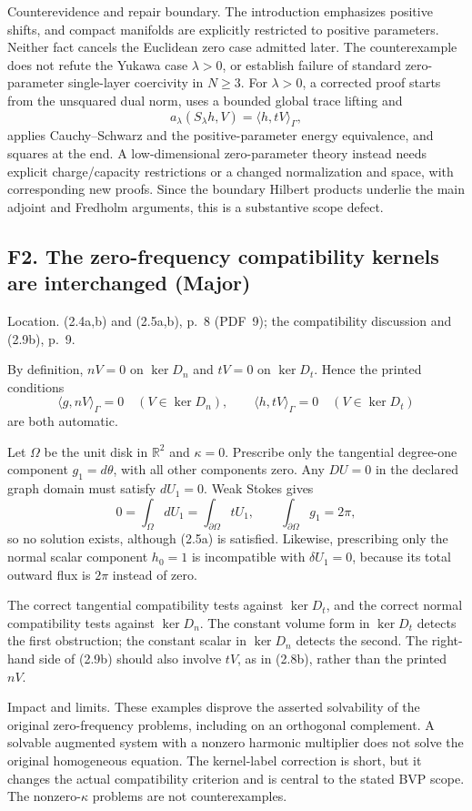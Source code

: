 \documentclass[10pt]{article}
\begin{document}
Counterevidence and repair boundary. The introduction emphasizes positive shifts, and compact manifolds are explicitly restricted to positive parameters. Neither fact cancels the Euclidean zero case admitted later. The counterexample does not refute the Yukawa case \(\lambda>0\), or establish failure of standard zero-parameter single-layer coercivity in \(N\ge3\). For \(\lambda>0\), a corrected proof starts from the unsquared dual norm, uses a bounded global trace lifting and \[a_\lambda(S_\lambda h,V)=\langle h,tV\rangle_\Gamma,\] applies Cauchy–Schwarz and the positive-parameter energy equivalence, and squares at the end. A low-dimensional zero-parameter theory instead needs explicit charge/capacity restrictions or a changed normalization and space, with corresponding new proofs. Since the boundary Hilbert products underlie the main adjoint and Fredholm arguments, this is a substantive scope defect.\par
\subsection*{F2. The zero-frequency compatibility kernels are interchanged (Major)}
Location. (2.4a,b) and (2.5a,b), p. 8 (PDF 9); the compatibility discussion and (2.9b), p. 9.\par
By definition, \(nV=0\) on \(\ker D_n\) and \(tV=0\) on \(\ker D_t\). Hence the printed conditions \[\langle g,nV\rangle_\Gamma=0\quad(V\in\ker D_n),\qquad
 \langle h,tV\rangle_\Gamma=0\quad(V\in\ker D_t)\] are both automatic.\par
Let \(\Omega\) be the unit disk in \(\mathbb R^2\) and \(\kappa=0\). Prescribe only the tangential degree-one component \(g_1=d\theta\), with all other components zero. Any \(DU=0\) in the declared graph domain must satisfy \(dU_1=0\). Weak Stokes gives \[0=\int_\Omega dU_1=\int_{\partial\Omega}tU_1,
 \qquad
 \int_{\partial\Omega}g_1=2\pi,\] so no solution exists, although (2.5a) is satisfied. Likewise, prescribing only the normal scalar component \(h_0=1\) is incompatible with \(\delta U_1=0\), because its total outward flux is \(2\pi\) instead of zero.\par
The correct tangential compatibility tests against \(\ker D_t\), and the correct normal compatibility tests against \(\ker D_n\). The constant volume form in \(\ker D_t\) detects the first obstruction; the constant scalar in \(\ker D_n\) detects the second. The right-hand side of (2.9b) should also involve \(tV\), as in (2.8b), rather than the printed \(nV\).\par
Impact and limits. These examples disprove the asserted solvability of the original zero-frequency problems, including on an orthogonal complement. A solvable augmented system with a nonzero harmonic multiplier does not solve the original homogeneous equation. The kernel-label correction is short, but it changes the actual compatibility criterion and is central to the stated BVP scope. The nonzero-\(\kappa\) problems are not counterexamples.\par
\end{document}

